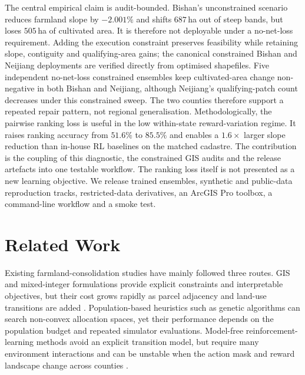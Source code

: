 \documentclass[11pt]{article}
\begin{document}
The central empirical claim is audit-bounded. Bishan's unconstrained scenario reduces farmland slope by $-2.001\%$ and shifts $687$\,ha out of steep bands, but loses $505$\,ha of cultivated area. It is therefore not deployable under a no-net-loss requirement. Adding the execution constraint preserves feasibility while retaining slope, contiguity and qualifying-area gains; the canonical constrained Bishan and Neijiang deployments are verified directly from optimised shapefiles. Five independent no-net-loss constrained ensembles keep cultivated-area change non-negative in both Bishan and Neijiang, although Neijiang's qualifying-patch count decreases under this constrained sweep. The two counties therefore support a repeated repair pattern, not regional generalisation. Methodologically, the pairwise ranking loss is useful in the low within-state reward-variation regime. It raises ranking accuracy from $51.6\%$ to $85.5\%$ and enables a $1.6\times$ larger slope reduction than in-house RL baselines on the matched cadastre. The contribution is the coupling of this diagnostic, the constrained GIS audits and the release artefacts into one testable workflow. The ranking loss itself is not presented as a new learning objective. We release trained ensembles, synthetic and public-data reproduction tracks, restricted-data derivatives, an ArcGIS Pro toolbox, a command-line workflow and a smoke test.

\section{Related Work}\label{sec:related-work}

Existing farmland-consolidation studies have mainly followed three routes. GIS and mixed-integer formulations provide explicit constraints and interpretable objectives, but their cost grows rapidly as parcel adjacency and land-use transitions are added \citep{cao2012boundary,stewart2004multi,aerts2002using}. Population-based heuristics such as genetic algorithms can search non-convex allocation spaces, yet their performance depends on the population budget and repeated simulator evaluations. Model-free reinforcement-learning methods avoid an explicit transition model, but require many environment interactions and can be unstable when the action mask and reward landscape change across counties \citep{zheng2023urban,equihua2024connectivity}.
\end{document}
